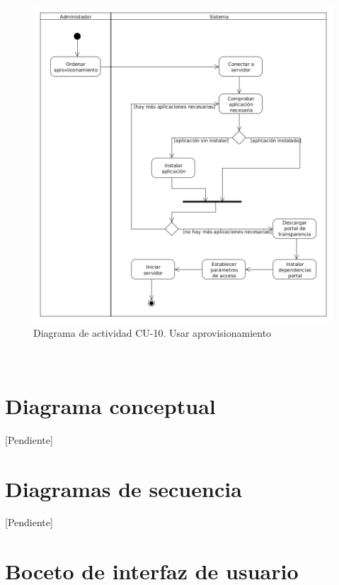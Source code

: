 \begin{figure}[!h]
  \begin{center}
  \includegraphics[width=1\textwidth]{imagenes/diag_act_cu_10.png}
  \caption{Diagrama de actividad CU-10. Usar aprovisionamiento}
  \label{fig:diag_act_cu_10}
  \end{center}
\end{figure}

\newpage
\
\newpage
\
\newpage
\
\newpage
\
\newpage
\
\newpage
\
\newpage
\
\newpage

\section{Diagrama conceptual}

[Pendiente]

\section{Diagramas de secuencia}

[Pendiente]

\section{Boceto de interfaz de usuario}

